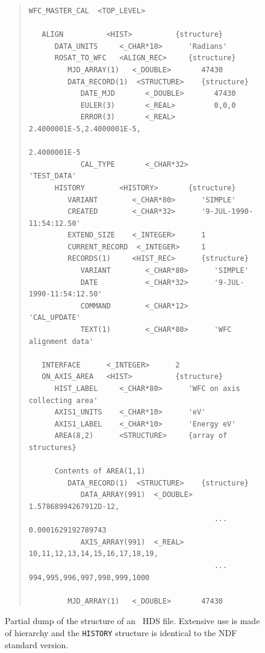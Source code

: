 \documentclass[final,authoryear,5p,times,twocolumn]{elsarticle}
\begin{document}
\begin{figure}[t]
\begin{minipage}{\textwidth}
\begin{quote}
\small
\begin{verbatim}
WFC_MASTER_CAL  <TOP_LEVEL>

   ALIGN          <HIST>          {structure}
      DATA_UNITS     <_CHAR*10>      'Radians'
      ROSAT_TO_WFC   <ALIGN_REC>     {structure}
         MJD_ARRAY(1)   <_DOUBLE>       47430
         DATA_RECORD(1)  <STRUCTURE>    {structure}
            DATE_MJD       <_DOUBLE>       47430
            EULER(3)       <_REAL>         0,0,0
            ERROR(3)       <_REAL>         2.4000001E-5,2.4000001E-5,
                                           2.4000001E-5
            CAL_TYPE       <_CHAR*32>      'TEST_DATA'
      HISTORY        <HISTORY>       {structure}
         VARIANT        <_CHAR*80>      'SIMPLE'
         CREATED        <_CHAR*32>      '9-JUL-1990-11:54:12.50'
         EXTEND_SIZE    <_INTEGER>      1
         CURRENT_RECORD  <_INTEGER>     1
         RECORDS(1)     <HIST_REC>      {structure}
            VARIANT        <_CHAR*80>      'SIMPLE'
            DATE           <_CHAR*32>      '9-JUL-1990-11:54:12.50'
            COMMAND        <_CHAR*12>      'CAL_UPDATE'
            TEXT(1)        <_CHAR*80>      'WFC alignment data'

   INTERFACE      <_INTEGER>      2
   ON_AXIS_AREA   <HIST>          {structure}
      HIST_LABEL     <_CHAR*80>      'WFC on axis collecting area'
      AXIS1_UNITS    <_CHAR*10>      'eV'
      AXIS1_LABEL    <_CHAR*10>      'Energy eV'
      AREA(8,2)      <STRUCTURE>     {array of structures}

      Contents of AREA(1,1)
         DATA_RECORD(1)  <STRUCTURE>    {structure}
            DATA_ARRAY(991)  <_DOUBLE>     1.57868994267912D-12,
                                           ... 0.0001629192789743
            AXIS_ARRAY(991)  <_REAL>       10,11,12,13,14,15,16,17,18,19,
                                           ... 994,995,996,997,998,999,1000

         MJD_ARRAY(1)   <_DOUBLE>       47430
\end{verbatim}
\end{quote}
\caption{Partial dump of the structure of an \asterix\ HDS
  file. Extensive use is made of hierarchy and the \texttt{HISTORY}
  structure is identical to the NDF standard version.}
\label{fig:asterix}
\end{minipage}
\end{figure}
\end{document}
